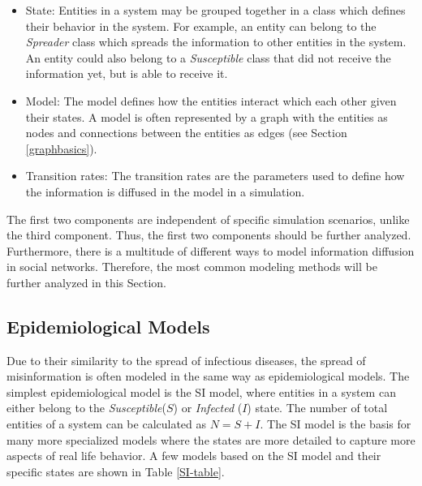 \begin{itemize}
    \item State: Entities in a system may be grouped together in a class which
    defines their behavior in the system. For example, 
    an entity can belong to the \textit{Spreader} class which 
    spreads the information
    to other entities in the system. An entity could also belong to a
    \textit{Susceptible} class that did not receive the information yet, 
    but is able to receive it.
    \item Model: The model defines how the entities interact which each other
    given their states. A model is often represented by a graph with the entities
    as nodes and connections between the entities as edges 
    (see Section \ref{graphbasics}).
    \item Transition rates: The transition rates are the parameters used
    to define how the information is diffused in the model in a simulation. 
\end{itemize}

The first two components are independent of specific simulation scenarios,
unlike the third component. Thus, the first two components should be further
analyzed. Furthermore, there is a multitude of different ways 
to model information diffusion in social networks. Therefore, the most common
modeling methods will be further analyzed in this Section.

\subsection{Epidemiological Models}
\label{epidemologicalmodels}

Due to their similarity to the spread of infectious diseases, 
the spread of misinformation is often modeled in the same way as epidemiological models.
The simplest epidemiological model is the SI model, where entities in a system
can either belong to the \textit{Susceptible}($S$) or 
\textit{Infected} ($I$) state. The number of total entities of a 
system can be calculated as $N=S+I$. The SI model is the basis for many
more specialized models where the states are more detailed to capture more 
aspects of real life behavior. A few models based on the SI model and their 
specific states are shown in Table \ref{SI-table}.

